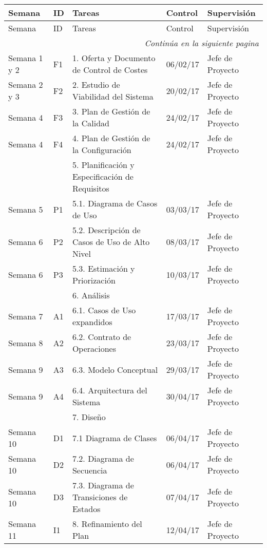 \begin{center}
\begin{longtable}{lllll}

 Semana 	&	ID	&	Tareas	&	Control	&	Supervisión	\\ \hline
\endfirsthead
 Semana 	&	ID	&	Tareas	&	Control	&	Supervisión	\\ \hline
\endhead

\hline \multicolumn{5}{r}{\textit{Continúa en la siguiente pagina}} \\
\endfoot
\endlastfoot

Semana 1 y 2	&	F1	&	1. Oferta y Documento de Control de Costes 	&	06/02/17	&	Jefe de Proyecto	\\
Semana 2 y 3	&	F2	&	2. Estudio de Viabilidad del Sistema	&	20/02/17	&	Jefe de Proyecto	\\
Semana 4	&	F3	&	3. Plan de Gestión de la Calidad	&	24/02/17	&	Jefe de Proyecto	\\
Semana 4	&	F4	&	4. Plan de Gestión de la Configuración	&	24/02/17	&	Jefe de Proyecto	\\
	&		&	5. Planificación y Especificación de Requisitos	&		&		\\
Semana 5	&	P1	&	5.1. Diagrama de Casos de Uso	&	03/03/17	&	Jefe de Proyecto	\\
Semana 6	&	P2	&	5.2. Descripción de Casos de Uso de Alto Nivel	&	08/03/17	&	Jefe de Proyecto	\\
Semana 6	&	P3	&	5.3. Estimación y Priorización	&	10/03/17	&	Jefe de Proyecto	\\
	&		&	6. Análisis	&		&		\\
Semana 7	&	A1	&	6.1. Casos de Uso expandidos	&	17/03/17	&	Jefe de Proyecto	\\
Semana 8	&	A2	&	6.2. Contrato de Operaciones	&	23/03/17	&	Jefe de Proyecto	\\
Semana 9	&	A3	&	6.3. Modelo Conceptual	&	29/03/17	&	Jefe de Proyecto	\\
Semana 9	&	A4	&	6.4. Arquitectura del Sistema	&	30/04/17	&	Jefe de Proyecto	\\
	&		&	7. Diseño	&		&		\\
Semana 10	&	D1	&	7.1 Diagrama de Clases	&	06/04/17	&	Jefe de Proyecto	\\
Semana 10	&	D2	&	7.2. Diagrama de Secuencia	&	06/04/17	&	Jefe de Proyecto	\\
Semana 10	&	D3	&	7.3. Diagrama de Transiciones de Estados	&	07/04/17	&	Jefe de Proyecto	\\
Semana 11	&	I1	&	8. Refinamiento del Plan 	&	12/04/17	&	Jefe de Proyecto	\\

\end{longtable}
\end{center}
